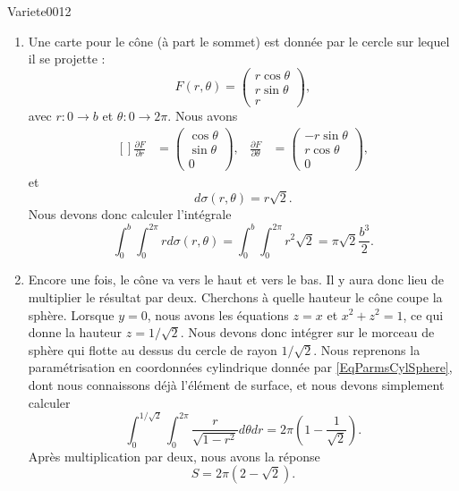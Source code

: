 \begin{corrige}{Variete0012}
\begin{enumerate}
		\item
			Une carte pour le cône (à part le sommet) est donnée par le cercle sur lequel il se projette :
			\begin{equation}
				F(r,\theta)=\begin{pmatrix}
					r\cos\theta	\\ 
					r\sin\theta	\\ 
					r	
				\end{pmatrix},
			\end{equation}
			avec $r\colon 0\to b$ et $\theta\colon 0\to 2\pi$. Nous avons
			\begin{equation}
				\begin{aligned}[]
					\frac{ \partial F }{ \partial r }&=\begin{pmatrix}
						\cos\theta	\\ 
						\sin\theta	\\ 
						0	
					\end{pmatrix},
					&\frac{ \partial F }{ \partial \theta }&=\begin{pmatrix}
						-r\sin\theta	\\ 
						r\cos\theta	\\ 
						0	
					\end{pmatrix},
				\end{aligned}
			\end{equation}
			et 
			\begin{equation}
				d\sigma(r,\theta)=r\sqrt{2}.
			\end{equation}
			Nous devons donc calculer l'intégrale
			\begin{equation}
				\int_0^b\int_0^{2\pi}rd\sigma(r,\theta)=\int_0^b\int_0^{2\pi}r^2\sqrt{2}=\pi\sqrt{2}\frac{ b^3 }{ 2 }.
			\end{equation}
			
		\item
			Encore une fois, le cône va vers le haut et vers le bas. Il y aura donc lieu de multiplier le résultat par deux. Cherchons à quelle hauteur le cône coupe la sphère. Lorsque $y=0$, nous avons les équations $z=x$ et $x^2+z^2=1$, ce qui donne la hauteur $z=1/\sqrt{2}$. Nous devons donc intégrer sur le morceau de sphère qui flotte au dessus du cercle de rayon $1/\sqrt{2}$. Nous reprenons la paramétrisation en coordonnées cylindrique donnée par \eqref{EqParmsCylSphere}, dont nous connaissons déjà l'élément de surface, et  nous devons simplement calculer
			\begin{equation}
				\int_0^{1/\sqrt{2}}\int_0^{2\pi}\frac{ r }{ \sqrt{1-r^2} }d\theta dr=2\pi(1-\frac{1}{ \sqrt{2} }).
			\end{equation}
			Après multiplication par deux, nous avons la réponse
			\begin{equation}
				S=2\pi(2-\sqrt{2}).
			\end{equation}
			

\end{enumerate}
\end{corrige}
